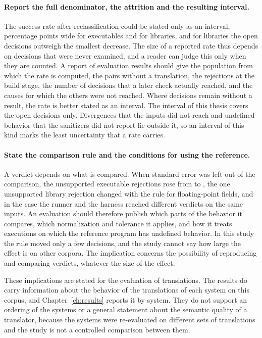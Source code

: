 \paragraph{Report the full denominator, the attrition and the resulting interval.} The success rate after reclassification could be stated only as an interval, \widthE{} percentage points wide for executables and \rqSRWidthTightLibAllPct{} for libraries, and for libraries the open decisions outweigh the smallest decrease. The size of a reported rate thus depends on decisions that were never examined, and a reader can judge this only when they are counted. A report of evaluation results should give the population from which the rate is computed, the pairs without a translation, the rejections at the build stage, the number of decisions that a later check actually reached, and the causes for which the others were not reached. Where decisions remain without a result, the rate is better stated as an interval. The interval of this thesis covers the open decisions only. Divergences that the inputs did not reach and undefined behavior that the sanitizers did not report lie outside it, so an interval of this kind marks the least uncertainty that a rate carries.

\paragraph{State the comparison rule and the conditions for using the reference.} A verdict depends on what is compared. When standard error was left out of the comparison, the unsupported executable rejections rose from  to , the one unsupported library rejection changed with the rule for floating-point fields, and in the case  the runner and the harness reached different verdicts on the same inputs. An evaluation should therefore publish which parts of the behavior it compares, which normalization and tolerance it applies, and how it treats executions on which the reference program has undefined behavior. In this study the rule moved only a few decisions, and the study cannot say how large the effect is on other corpora. The implication concerns the possibility of reproducing and comparing verdicts, whatever the size of the effect.

These implications are stated for the evaluation of translations. The results do carry information about the behavior of the translations of each system on this corpus, and Chapter~\ref{ch:results} reports it by system. They do not support an ordering of the systems or a general statement about the semantic quality of a translator, because the systems were re-evaluated on different sets of translations and the study is not a controlled comparison between them.
